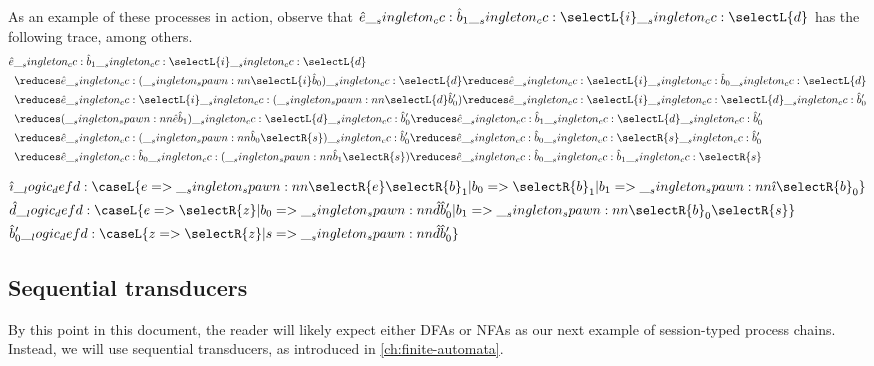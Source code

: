 As an example of these processes in action, observe that $\defp{e} \cc \defp{b}_1 \cc \selectL{i} \cc \selectL{d}$ has the following trace, among others.
\begin{align*}
  \MoveEqLeft[.5]
  \defp{e} \cc \defp{b}_1 \cc \selectL{i} \cc \selectL{d} \\
    &\reduces \defp{e} \cc (\spawn{\selectL{i}}{\defp{b}_0}) \cc \selectL{d}
     \reduces \defp{e} \cc \selectL{i} \cc \defp{b}_0 \cc \selectL{d} \\
    &\reduces \defp{e} \cc \selectL{i} \cc (\spawn{\selectL{d}}{\defp{b}'_0})
     \reduces \defp{e} \cc \selectL{i} \cc \selectL{d} \cc \defp{b}'_0 \\
    &\reduces (\spawn{\defp{e}}{\defp{b}_1}) \cc \selectL{d} \cc \defp{b}'_0
     \reduces \defp{e} \cc \defp{b}_1 \cc \selectL{d} \cc \defp{b}'_0 \\
    &\reduces \defp{e} \cc (\spawn{\defp{b}_0}{\selectR{s}}) \cc \defp{b}'_0
     \reduces \defp{e} \cc \defp{b}_0 \cc \selectR{s} \cc \defp{b}'_0 \\
    &\reduces \defp{e} \cc \defp{b}_0 \cc (\spawn{\defp{b}_1}{\selectR{s}})
     \reduces \defp{e} \cc \defp{b}_0 \cc \defp{b}_1 \cc \selectR{s}
\end{align*}



\begin{equation*}
  \begin{lgathered}
    \defp{\imath} \defd \caseL{e => \spawn{\selectR{e}}{\selectR{b}_1}
                             | b_0 => \selectR{b}_1
                             | b_1 => \spawn{\defp{\imath}}{\selectR{b}_0}}
    \\
    \defp{d} \defd \caseL{e => \selectR{z}
                        | b_0 => \spawn{\defp{d}}{\defp{b}'_0}
                        | b_1 => \spawn{\selectR{b}_0}{\selectR{s}}}
    \\
    \defp{b}'_0 \defd \caseL{z => \selectR{z}
                           | s => \spawn{\defp{d}}{\defp{b}'_0}}
  \end{lgathered}
\end{equation*}



\subsection{Sequential transducers}\label{sec:process-chains:transducer}

By this point in this document, the reader will likely expect either \acp{DFA} or \acp{NFA} as our next example of session-typed process chains.
Instead, we will use sequential transducers, as introduced in \cref{ch:finite-automata}.

